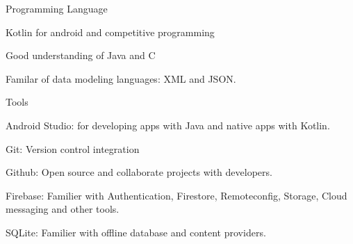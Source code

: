\begin{cventries}
  \cventry
    {Programming Language}
    {}
    {}
    {}
    {
      \begin{cvitems}
        \item {Kotlin for android and competitive programming}
        \item {Good understanding of Java and C}
        \item {Familar of data modeling languages: XML and JSON.}
      \end{cvitems}
    }

    \cventry
    {Tools}
    {}
    {}
    {}
    {
      \begin{cvitems}
        \item {Android Studio: for developing apps with Java and native apps with Kotlin.}
        \item {Git: Version control integration}
        \item {Github: Open source and collaborate projects with developers.}
        \item {Firebase: Familier with Authentication, Firestore, Remoteconfig, Storage, Cloud messaging and other tools.}
        \item {SQLite: Familier with offline database and content providers.}
      \end{cvitems}
    }
\end{cventries}
